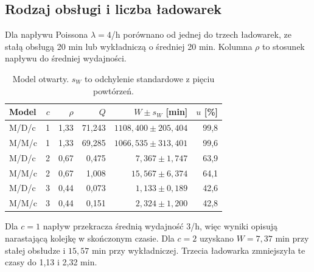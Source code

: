 \documentclass[11pt,a4paper]{article}
\begin{document}
\subsection{Rodzaj obsługi i liczba ładowarek}
Dla napływu Poissona $\lambda=4$/h porównano od jednej do trzech ładowarek, ze stałą obsługą 20 min lub wykładniczą o średniej 20 min. Kolumna $\rho$ to stosunek napływu do średniej wydajności.
\begin{table}[H]
\centering\small
\begin{tabular}{lrrrrr}
\toprule
Model & $c$ & $\rho$ & $Q$ & $W\pm s_W$ [min] & $u$ [\%] \\
\midrule
M/D/c & 1 & 1,33 & 71,243 & \(1108,400 \pm 205,404\) & 99,8 \\
M/M/c & 1 & 1,33 & 69,285 & \(1066,535 \pm 313,401\) & 99,6 \\
M/D/c & 2 & 0,67 & 0,475 & \(7,367 \pm 1,747\) & 63,9 \\
M/M/c & 2 & 0,67 & 1,008 & \(15,567 \pm 6,374\) & 64,1 \\
M/D/c & 3 & 0,44 & 0,073 & \(1,133 \pm 0,189\) & 42,6 \\
M/M/c & 3 & 0,44 & 0,151 & \(2,324 \pm 1,200\) & 42,8 \\
\bottomrule
\end{tabular}
\caption{Model otwarty. $s_W$ to odchylenie standardowe z pięciu powtórzeń.}\label{tab:open}
\end{table}
Dla $c=1$ napływ przekracza średnią wydajność 3/h, więc wyniki opisują narastającą kolejkę w skończonym czasie. Dla $c=2$ uzyskano $W=7{,}37$ min przy stałej obsłudze i $15{,}57$ min przy wykładniczej. Trzecia ładowarka zmniejszyła te czasy do 1,13 i 2,32 min.
\end{document}
